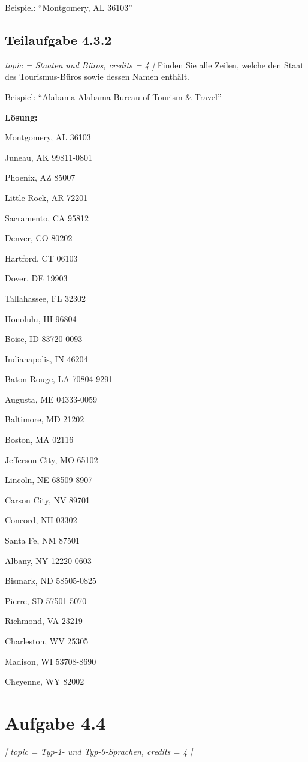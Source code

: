 \documentclass[12pt]{article}
\begin{document}
 Beispiel: "`Montgomery, AL 36103"' 
  
  
  
  
 \subsection*{Teilaufgabe 4.3.2} 
\emph{ topic = {Staaten und Büros}, 
 credits = 4 
 ] }
 Finden Sie alle Zeilen, welche den Staat des Tourismus-Büros sowie dessen Namen enthält.  
  
 Beispiel: "`Alabama 	Alabama Bureau of Tourism \& Travel"' 
  
\textbf{ Lösung:}  

Montgomery, AL 36103

Juneau, AK 99811-0801

Phoenix, AZ 85007

Little Rock, AR 72201

Sacramento, CA 95812

Denver, CO 80202

Hartford, CT 06103

Dover, DE 19903

Tallahassee, FL 32302

Honolulu, HI 96804

Boise, ID 83720-0093

Indianapolis, IN 46204

Baton Rouge, LA 70804-9291

Augusta, ME 04333-0059

Baltimore, MD 21202

Boston, MA 02116

Jefferson City, MO 65102

Lincoln, NE 68509-8907

Carson City, NV 89701

Concord, NH 03302

Santa Fe, NM 87501

Albany, NY 12220-0603

Bismark, ND 58505-0825

  Pierre, SD 57501-5070

  Richmond,  VA 23219

  Charleston, WV 25305

  Madison, WI 53708-8690

  Cheyenne, WY 82002
  \section*{Aufgabe 4.4} 
\emph{[ 
 topic = Typ-1- und Typ-0-Sprachen, 
 credits = 4 
 ] }
  
\end{document}
